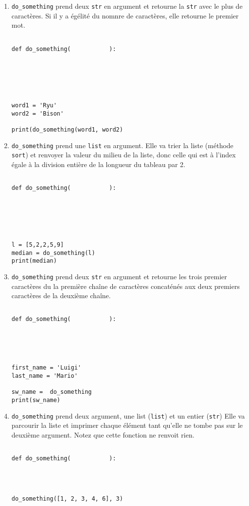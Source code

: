 \documentclass[12pt,a4paper]{article}
\newcommand{\codeintext}[1]{\texttt{#1}}
\begin{document}
\begin{enumerate}
\item
\codeintext{do\_something} prend deux \codeintext{str} en argument et retourne la \codeintext{str} avec le plus de caractères.
Si il y a égélité du nomnre de caractères, elle retourne le premier mot.
\begin{lstlisting}

def do_something(           ):






word1 = 'Ryu'
word2 = 'Bison'

print(do_something(word1, word2)
\end{lstlisting}


\item
\codeintext{do\_something} prend une \codeintext{list} en argument.
Elle va trier la liste (méthode \codeintext{sort}) et renvoyer la valeur du milieu de la liste, donc celle qui est à l'index égale à la division entière de la longueur du tableau par 2.

\begin{lstlisting}

def do_something(           ):






l = [5,2,2,5,9]
median = do_something(l)
print(median)
\end{lstlisting}

\pagebreak
\item
\codeintext{do\_something} prend deux \codeintext{str} en argument et retourne les trois premier caractères du la première chaîne de caractères concaténés aux deux premiers caractères de la deuxième chaîne.
\begin{lstlisting}

def do_something(           ):





first_name = 'Luigi'
last_name = 'Mario'

sw_name =  do_something
print(sw_name)
\end{lstlisting}


\item
\codeintext{do\_something} prend deux argument, une list (\codeintext{list}) et un entier (\codeintext{str})
Elle va parcourir la liste et imprimer chaque élément tant qu'elle ne tombe pas sur le deuxième argument.
Notez que cette fonction ne renvoit rien.
\begin{lstlisting}

def do_something(           ):




do_something([1, 2, 3, 4, 6], 3)
\end{lstlisting}
\end{enumerate}
\end{document}
